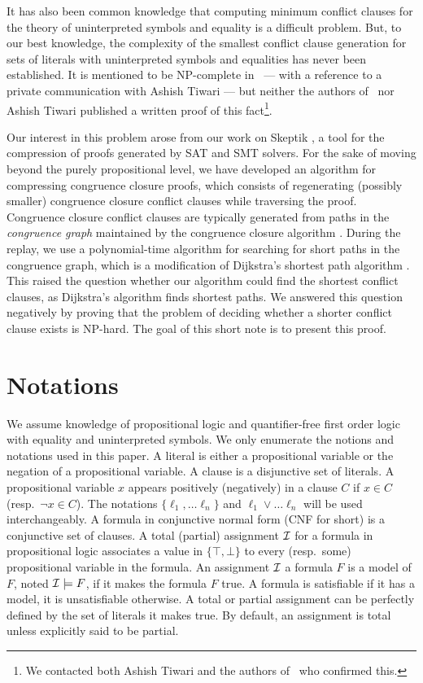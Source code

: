 \documentclass{easychair}
\begin{document}
It has also been common knowledge that computing minimum conflict clauses for
the theory of uninterpreted symbols and equality is a difficult problem.  But,
to our best knowledge, the complexity of the smallest conflict clause generation
for sets of literals with uninterpreted symbols and equalities has never been
established.  It is mentioned to be NP-complete in~\cite{Nieuwenhuis8} --- with
a reference to a private communication with Ashish Tiwari --- but neither the
authors of~\cite{Nieuwenhuis8} nor Ashish Tiwari published a written proof of
this fact\footnote{We contacted both Ashish Tiwari and the authors
  of~\cite{Nieuwenhuis8} who confirmed this.}.

Our interest in this problem arose from our work on Skeptik \cite{Boudou1}, a tool for the compression of proofs generated by SAT and SMT solvers. For the sake of moving beyond the purely propositional level, we have developed an algorithm for compressing congruence closure proofs, which consists of regenerating (possibly smaller) congruence closure conflict clauses while traversing the proof. Congruence closure conflict clauses are typically generated from paths in the \emph{congruence graph} maintained by the congruence closure algorithm \cite{Fontaine2004,Nieuwenhuis6,Nieuwenhuis9}. During the replay, we use a polynomial-time algorithm for searching for short paths in the congruence graph, which is a modification of Dijkstra's shortest path algorithm \cite{Dijkstra1959}. This raised the question whether our algorithm could find the shortest conflict clauses, as Dijkstra's algorithm finds shortest paths. We answered this question negatively by proving that the problem of deciding whether a shorter conflict clause exists is NP-hard. The goal of this short note is to present this proof.

\section*{Notations}

We assume knowledge of propositional logic and quantifier-free first order logic
with equality and uninterpreted symbols.  We only enumerate the notions and
notations used in this paper.
A literal is either a propositional variable or the negation of a propositional
variable.  A clause is a disjunctive set of literals.  A propositional variable
$x$ appears positively (negatively) in a clause $C$ if $x \in C$ (resp.\ $\neg x
\in C$).  The notations $\{\ell_1, \dots \ell_n\}$ and $\ell_1 \vee \dots
\ell_n$ will be used interchangeably.  A formula in conjunctive normal form (CNF
for short) is a conjunctive set of clauses.  A total (partial) assignment $\cal
I$ for a formula in propositional logic associates a value in $\{\top, \bot\}$
to every (resp.\ some) propositional variable in the formula.  An assignment
$\cal I$ a formula $F$ is a model of $F$, noted ${\cal I}\models F$, if it makes
the formula $F$ true.  A formula is satisfiable if it has a model, it is
unsatisfiable otherwise.  A total or partial assignment can be perfectly
defined by the set of literals it makes true.  By default, an assignment is
total unless explicitly said to be partial.
\end{document}

